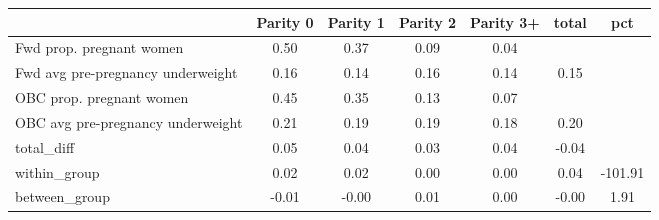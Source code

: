 \begin{tabular}{l*{6}{c}}
\toprule
            &\multicolumn{1}{c}{Parity 0}&\multicolumn{1}{c}{Parity 1}&\multicolumn{1}{c}{Parity 2}&\multicolumn{1}{c}{Parity 3+}&\multicolumn{1}{c}{total}&\multicolumn{1}{c}{pct}\\
\midrule
\midrule
Fwd prop. pregnant women&        0.50&        0.37&        0.09&        0.04&            &            \\
Fwd avg pre-pregnancy underweight&        0.16&        0.14&        0.16&        0.14&        0.15&            \\
OBC prop. pregnant women&        0.45&        0.35&        0.13&        0.07&            &            \\
OBC avg pre-pregnancy underweight&        0.21&        0.19&        0.19&        0.18&        0.20&            \\
total\_diff  &        0.05&        0.04&        0.03&        0.04&       -0.04&            \\
within\_group&        0.02&        0.02&        0.00&        0.00&        0.04&     -101.91\\
between\_group&       -0.01&       -0.00&        0.01&        0.00&       -0.00&        1.91\\
\bottomrule
\end{tabular}
